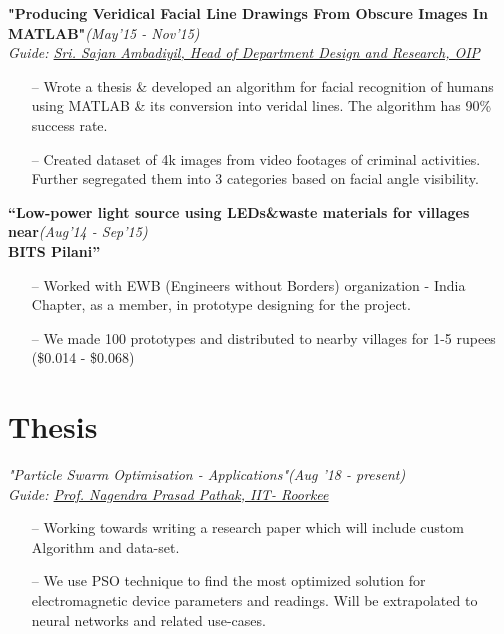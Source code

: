 \documentclass[margin,line]{templates/resume}
\newcommand{\myhref}[3][blue]{\href{#2}{\color{#1}{#3}}}
\newcommand{\compresslist}{%
\setlength{\itemsep}{3pt}%
\setlength{\parskip}{0pt}%
\setlength{\parsep}{0pt}%
}
\begin{document}
\begin{resume}
\newpage
\vspace{-0.2cm}    
\textsf{\textbf{"Producing Veridical Facial Line Drawings From Obscure Images In MATLAB"}}\hfill\textit{\small(May'15 - Nov'15)}
\\ {\textit{Guide: \href{http://www.cdit.org/who-who}{ Sri. Sajan Ambadiyil, Head of Department Design and Research, OIP}}} \hfill{\myhref[darkblue]{https://esha-singh.github.io/\#mpi}{Web}}
\normalsize
\vspace{0.05cm}
\begin{itemize}[leftmargin=*]\compresslist
  \item[--]Wrote a thesis \& developed an algorithm for facial recognition of humans using MATLAB \& its conversion into veridal lines. The algorithm has 90\% success rate.
\item[--]Created dataset of 4k images from video footages of criminal activities. Further segregated them into 3 categories based on facial angle visibility. 
\end{itemize}

\vspace{-0.2cm}    
\textsf{\textbf{“Low-power light source using LEDs\&waste materials for villages near}}\hfill\textit{\small(Aug'14 - Sep'15)}\\
\textsf{\textbf{ BITS Pilani”}}
\normalsize
\vspace{0.05cm}
\begin{itemize}[leftmargin=*]\compresslist
    \item[--]Worked with EWB (Engineers without Borders) organization - India Chapter, as a member, in prototype designing for the project.
    \item[--]We made 100 prototypes and distributed to nearby villages for 1-5 rupees (\$0.014 - \$0.068) 
\end{itemize}

\section{\mysidestyle Thesis}
\textsf{\textit{"Particle Swarm Optimisation - Applications"}}\hfill\textit{\small(Aug '18 - present)}
\\ {\textit{Guide: \href{https://www.iitr.ac.in/centers/NT/pages/People+Faculty+Dr__Nagendra_Prasad_Pathak.html}{Prof. Nagendra Prasad Pathak, IIT- Roorkee}}} \hfill{\myhref[darkblue]{https://esha-singh.github.io/\#mpi}{Web}}
\vspace{0.05cm}
\begin{itemize}[leftmargin=*]\compresslist
\item[--]Working towards writing a research paper which will include custom Algorithm and data-set. 
\item[--]We use PSO technique to find the most optimized solution for electromagnetic device parameters and readings. Will be extrapolated to neural networks and related use-cases. 
\end{itemize}


\end{resume}
\end{document}

